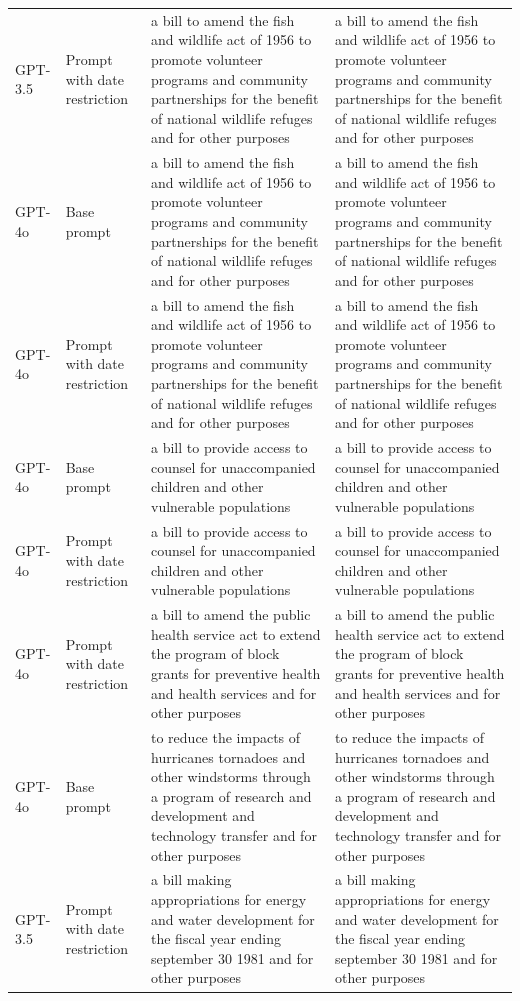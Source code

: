 \begin{longtable}{>{\raggedright\arraybackslash}p{1.4cm}>{\raggedright\arraybackslash}p{1.4cm}>{\raggedright\arraybackslash}p{5.5cm}>{\raggedright\arraybackslash}p{5.5cm}}
GPT-3.5 & Prompt with date restriction & a bill to amend the fish and wildlife act of 1956 to promote volunteer programs and community partnerships for the benefit of national wildlife refuges and for other purposes & a bill to amend the fish and wildlife act of 1956 to promote volunteer programs and community partnerships for the benefit of national wildlife refuges and for other purposes\\
GPT-4o & Base prompt & a bill to amend the fish and wildlife act of 1956 to promote volunteer programs and community partnerships for the benefit of national wildlife refuges and for other purposes & a bill to amend the fish and wildlife act of 1956 to promote volunteer programs and community partnerships for the benefit of national wildlife refuges and for other purposes\\
GPT-4o & Prompt with date restriction & a bill to amend the fish and wildlife act of 1956 to promote volunteer programs and community partnerships for the benefit of national wildlife refuges and for other purposes & a bill to amend the fish and wildlife act of 1956 to promote volunteer programs and community partnerships for the benefit of national wildlife refuges and for other purposes\\
GPT-4o & Base prompt & a bill to provide access to counsel for unaccompanied children and other vulnerable populations & a bill to provide access to counsel for unaccompanied children and other vulnerable populations\\
GPT-4o & Prompt with date restriction & a bill to provide access to counsel for unaccompanied children and other vulnerable populations & a bill to provide access to counsel for unaccompanied children and other vulnerable populations\\
GPT-4o & Prompt with date restriction & a bill to amend the public health service act to extend the program of block grants for preventive health and health services and for other purposes & a bill to amend the public health service act to extend the program of block grants for preventive health and health services and for other purposes\\
GPT-4o & Base prompt & to reduce the impacts of hurricanes tornadoes and other windstorms through a program of research and development and technology transfer and for other purposes & to reduce the impacts of hurricanes tornadoes and other windstorms through a program of research and development and technology transfer and for other purposes\\
GPT-3.5 & Prompt with date restriction & a bill making appropriations for energy and water development for the fiscal year ending september 30 1981 and for other purposes & a bill making appropriations for energy and water development for the fiscal year ending september 30 1981 and for other purposes\\

\end{longtable}
